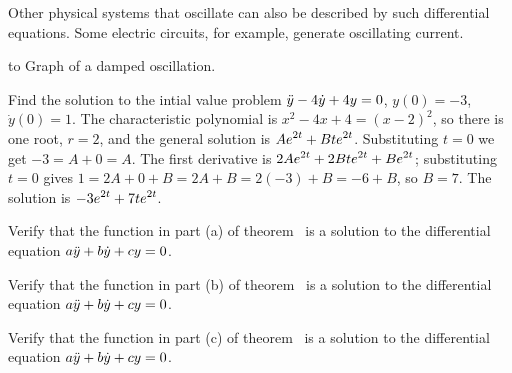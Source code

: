 Other physical systems that oscillate can also be described by such
differential equations. Some electric circuits, for example, generate
oscillating current.

\figure
\texonly
\hbox to \endtexonly
{}
\begincaption
Graph of a damped oscillation.
\endcaption
\endfigure

\example Find the solution to the intial value problem
$\displaystyle\ddot y-4\dot y+4y=0$, $y(0)=-3$, $\dot y(0)=1$. The
characteristic polynomial is $x^2-4x+4=(x-2)^2$, so there is one root,
$r=2$, 
and the general solution is $\displaystyle Ae^{2t}+Bte^{2t}$. Substituting
$t=0$ we get $-3=A+0=A$. The first derivative is
$\displaystyle 2Ae^{2t}+2Bte^{2t}+Be^{2t}$; substituting $t=0$ gives
$1=2A+0+B=2A+B=2(-3)+B=-6+B$, so $B=7$. The solution is
$\displaystyle -3e^{2t}+7te^{2t}$.
\endexample

\exercises

\exercise Verify that the function in part (a) of
theorem~ is a solution to
the differential equation $\displaystyle a\ddot y+b\dot y+cy=0$.
\endexercise

\exercise Verify that the function in part (b) of
theorem~ is a solution to
the differential equation $\displaystyle a\ddot y+b\dot y+cy=0$.
\endexercise

\exercise Verify that the function in part (c) of
theorem~ is a solution to
the differential equation $\displaystyle a\ddot y+b\dot y+cy=0$.
\endexercise

